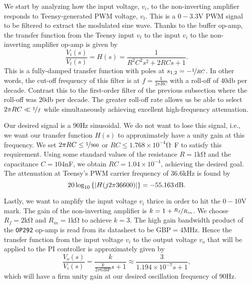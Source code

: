 We start by analyzing how the input voltage, $v_i$, to the non-inverting
amplifier responds to Teensy-generated PWM voltage, $v_t$. This is a
$0-3.3$\unit{\volt} PWM signal to be filtered to extract the modulated sine
wave. Thanks to the buffer op-amp, the transfer function from the Teensy input
$v_t$ to the input $v_i$ to the non-inverting amplifier op-amp is given by \[
\frac{V_i(s)}{V_t(s)} = H(s) = \frac{1}{R^2C^2s^2+2RCs+1}.\]
%
This is a fully-damped transfer function with poles at $s_{1,2} =
-\nicefrac{1}{RC}$. In other words, the cut-off frequency of this filter is at
$f = \frac{1}{2\pi RC}$ with a roll-off of $40$\unit{\decibel} per decade.
Contrast this to the first-order filter of the previous subsection where the
roll-off was $20$\unit{\decibel} per decade. The greater roll-off rate allows us
be able to select $2\pi RC \ll \nicefrac{1}{f}$ while simultaneously achieving
excellent high-frequency attenuation.

Our desired signal is a $90$\unit{\hertz} sinusoidal. We do not want to lose
this signal, i.e., we want our transfer function $H(s)$ to approximately have a
unity gain at this frequency. We set $2\pi RC \leq \nicefrac{1}{900}$ or $RC
\leq 1.768 \times 10^{-4}$\unit{\ohm\farad} to satisfy this requirement. Using
some standard values of the resistance $R = 1$\unit{\kilo\ohm} and the
capacitance $C = 104$\unit{\nano\farad}, we obtain $RC = 1.04 \times 10^{-4}$,
achieving the desired goal. The attenuation at Teensy's PWM carrier frequency of
$36.6$\unit{\kilo\hertz} is found by \[ 20 \log_{10}\left\{\abs{H(j 2\pi
36600)}\right\} = -55.163\,\unit{\decibel}. \]

Lastly, we want to amplify the input voltage $v_i$ thrice in order to hit the
$0-10$\unit{\volt} mark. The gain of the non-inverting amplifier is $k = 1 +
\nicefrac{R_f}{R_{in}}$. We choose $R_f = 2$\unit{\kilo\ohm} and $R_{in} =
1$\unit{\kilo\ohm} to achieve $k = 3$. The high gain bandwidth product of the
\texttt{OP292} op-amp is read from its datasheet to be $\text{GBP} =
4$\unit{\mega\hertz}. Hence the transfer function from the input voltage $v_i$
to the output voltage $v_o$ that will be applied to the PI controller is
approximately given by \[ \frac{V_o(s)}{V_i(s)} =
\frac{k}{\frac{k}{2\pi\text{GBP}}s + 1} \approx \frac{3}{1.194\times 10^{-7}s +
1}, \] which will have a firm unity gain at our desired oscillation frequency of
$90$\unit{\hertz}.
